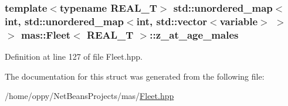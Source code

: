 \hypertarget{structmas_1_1_fleet_a177b878b912cd2c01729070c46e0f27d}{
\subsubsection[{z\-\_\-at\-\_\-age\-\_\-males}]{\setlength{\rightskip}{0pt plus 5cm}template$<$typename R\-E\-A\-L\-\_\-\-T$>$ std\-::unordered\-\_\-map$<$int, std\-::unordered\-\_\-map$<$int, std\-::vector$<${\bf variable}$>$ $>$ $>$ {\bf mas\-::\-Fleet}$<$ R\-E\-A\-L\-\_\-\-T $>$\-::z\-\_\-at\-\_\-age\-\_\-males}}\label{structmas_1_1_fleet_a177b878b912cd2c01729070c46e0f27d}


Definition at line 127 of file Fleet.\-hpp.



The documentation for this struct was generated from the following file\-:\begin{DoxyCompactItemize}
\item 
/home/oppy/\-Net\-Beans\-Projects/mas/\hyperlink{_fleet_8hpp}{Fleet.\-hpp}\end{DoxyCompactItemize}
